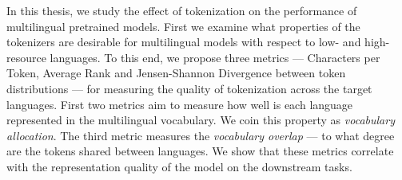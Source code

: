



In this thesis, we study the effect of tokenization on the performance of multilingual pretrained models.  First we examine what properties of the tokenizers are desirable for multilingual models with respect to low- and high- resource languages. To this end, we propose three metrics --- Characters per Token, Average Rank and Jensen-Shannon Divergence between token distributions --- for measuring the quality of tokenization across the target languages. First two metrics aim to measure how well is each language represented in the multilingual vocabulary. We coin this property as \textit{vocabulary allocation}. The third metric measures the \textit{vocabulary overlap} --- to what degree are the tokens shared between languages. We show that these metrics correlate with the representation quality of the model on the downstream tasks. 

